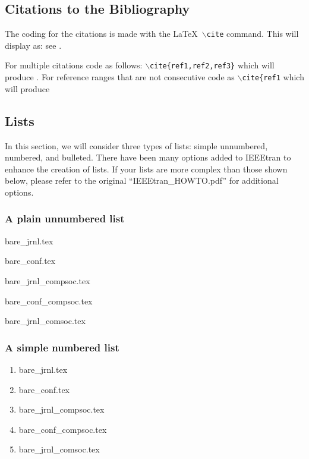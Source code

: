 \documentclass[journal]{IEEEtran}
\begin{document}
\subsection{Citations to the Bibliography}
The coding for the citations is made with the \LaTeX\ $\backslash${\tt{cite}} command. 
This will display as: see \cite{ref1}.

For multiple citations code as follows: {\tt{$\backslash$cite\{ref1,ref2,ref3\}}}
 which will produce \cite{ref1}. For reference ranges that are not consecutive code as {\tt{$\backslash$cite\{ref1}} which will produce  \cite{ref1}

\subsection{Lists}
In this section, we will consider three types of lists: simple unnumbered, numbered, and bulleted. There have been many options added to IEEEtran to enhance the creation of lists. If your lists are more complex than those shown below, please refer to the original ``IEEEtran\_HOWTO.pdf'' for additional options.\\

\subsubsection*{\bf A plain  unnumbered list}
\begin{list}{}{}
\item{bare\_jrnl.tex}
\item{bare\_conf.tex}
\item{bare\_jrnl\_compsoc.tex}
\item{bare\_conf\_compsoc.tex}
\item{bare\_jrnl\_comsoc.tex}
\end{list}

\subsubsection*{\bf A simple numbered list}
\begin{enumerate}
\item{bare\_jrnl.tex}
\item{bare\_conf.tex}
\item{bare\_jrnl\_compsoc.tex}
\item{bare\_conf\_compsoc.tex}
\item{bare\_jrnl\_comsoc.tex}
\end{enumerate}
\end{document}
